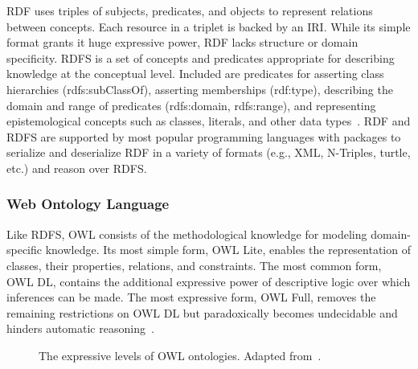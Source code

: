 \ac{RDF} uses triples of subjects, predicates, and objects to represent relations between concepts.
Each resource in a triplet is backed by an \ac{IRI}.
While its simple format grants it huge expressive power, \ac{RDF} lacks structure or domain specificity.
\ac{RDFS} is a set of concepts and predicates appropriate for describing knowledge at the conceptual level.
Included are predicates for asserting class hierarchies (rdfs:subClassOf), asserting memberships (rdf:type), describing the domain and range of predicates (rdfs:domain, rdfs:range), and representing epistemological concepts such as classes, literals, and other data types~\cite{Beckett2014}.
RDF and RDFS are supported by most popular programming languages with packages to serialize and deserialize RDF in a variety of formats (e.g., \ac{XML}, N-Triples, turtle, etc.) and reason over \ac{RDFS}.

\subsubsection{Web Ontology Language}

Like \ac{RDFS}, \ac{OWL} consists of the methodological knowledge for modeling domain-specific knowledge.
Its most simple form, \ac{OWL} Lite, enables the representation of classes, their properties, relations, and constraints.
The most common form, \ac{OWL} \ac{DL}, contains the additional expressive power of descriptive logic over which inferences can be made.
The most expressive form, \ac{OWL} Full, removes the remaining restrictions on \ac{OWL} \ac{DL} but paradoxically becomes undecidable and hinders automatic reasoning~\cite{Marchetti2008}.

\begin{figure}
    \captionsetup{format=plain}
    \caption[Descriptive Levels of OWL]{The expressive levels of OWL ontologies. Adapted from~\cite{Marchetti2008}.}
    \label{Fig:owl_types}
\end{figure}

